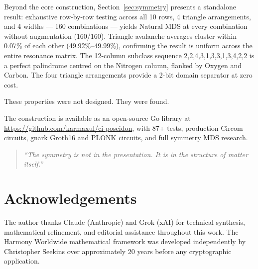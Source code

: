 \documentclass[preprint]{iacrtrans}
\begin{document}
Beyond the core construction, Section~\ref{sec:symmetry} presents a
standalone result: exhaustive row-by-row testing across all 10 rows,
4 triangle arrangements, and 4 widths — 160 combinations — yields Natural
MDS at every combination without augmentation (160/160). Triangle avalanche
averages cluster within 0.07\% of each other (49.92\%--49.99\%), confirming
the result is uniform across the entire resonance matrix. The 12-column
subclass sequence 2,2,4,3,1,3,3,1,3,4,2,2 is a perfect palindrome
centred on the Nitrogen column, flanked by Oxygen and Carbon. The four
triangle arrangements provide a 2-bit domain separator at zero cost.

These properties were not designed. They were found.

The construction is available as an open-source Go library at
\url{https://github.com/karmaxul/ci-poseidon}, with 87+ tests, production
Circom circuits, gnark Groth16 and PLONK circuits, and full symmetry MDS research.

\begin{quote}
\itshape
``The symmetry is not in the presentation.
It is in the structure of matter itself.''
\end{quote}

\section*{Acknowledgements}

The author thanks Claude (Anthropic) and Grok (xAI) for technical synthesis, mathematical refinement, and editorial assistance throughout this work.
The Harmony Worldwide mathematical framework was developed
independently by Christopher Seekins over approximately 20 years before any
cryptographic application.



\end{document}
